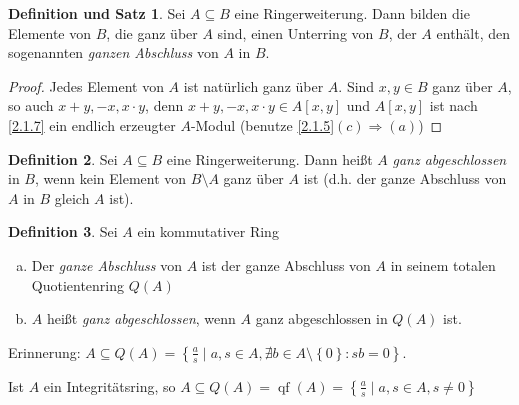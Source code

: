 \documentclass[
twoside=semi,
fontsize=12,
DIV=12, 
cleardoublepage=current,
leqno,
headings=optiontoheadandtoc, 
toc=idx
]{scrbook}
\newcommand{\set}[1]{\left\{ #1 \right\}}
\DeclareMathOperator{\qf}{qf}
\theoremstyle{definition}
\newtheorem{definition}{Definition}[section]
\newtheorem{def-satz}[definition]{Definition und Satz}
\begin{document}
	
	\begin{def-satz}\label{2.1.10}\hfill\newline
		Sei $A \subseteq B$ eine Ringerweiterung. Dann bilden die Elemente von $B$, die ganz \"uber $A$ sind, einen Unterring von $B$, der $A$ enth\"alt, den sogenannten \emph{ganzen Abschluss} von $A$ in $B$.
		
		\begin{proof}
			Jedes Element von $A$ ist nat\"urlich ganz \"uber $A$. Sind $x,y \in B$ ganz \"uber $A$, so auch $x+y, -x, x\cdot y$, denn $x+y,-x,x\cdot y\in A[x,y]$ und $A[x,y]$ ist nach \ref{2.1.7} ein endlich erzeugter $A$-Modul (benutze \ref{2.1.5}$(c)\Longrightarrow(a)$) 
		\end{proof} 
 	\end{def-satz}
 
 	\begin{definition}\label{2.1.11}\hfill\newline
 		Sei $A \subseteq B$ eine Ringerweiterung. Dann hei\ss t $A$ \emph{ganz abgeschlossen} in $B$, wenn kein Element von $B\setminus A$ ganz \"uber $A$ ist (d.h. der ganze Abschluss von $A$ in $B$ gleich $A$ ist).
 	\end{definition}
 
 	\begin{definition}\label{2.1.12}\hfill\newline
 		Sei $A$ ein kommutativer Ring
 		\begin{enumerate}[(a)]
 			\item Der \emph{ganze Abschluss} von $A$ ist der ganze Abschluss von $A$ in seinem totalen Quotientenring $Q(A)$
 			
 			\item $A$ hei\ss t \emph{ganz abgeschlossen}, wenn $A$ ganz abgeschlossen in $Q(A)$ ist.
 		\end{enumerate}
 		Erinnerung: $\displaystyle A \subseteq Q(A) = \set{\frac{a}{s} \mid a,s \in A, \nexists b \in A\setminus\set{0}: sb = 0}$.
 		
 		Ist $A$ ein Integrit\"atsring, so $\displaystyle A \subseteq Q(A) = \qf(A) = \set{\frac{a}{s} \mid a,s \in A, s \neq 0}$ 
 	\end{definition}
 
\end{document}
